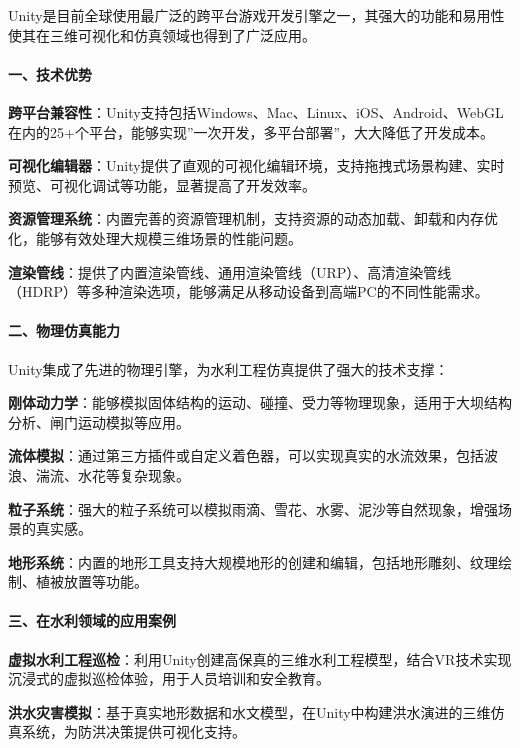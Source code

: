 Unity是目前全球使用最广泛的跨平台游戏开发引擎之一，其强大的功能和易用性使其在三维可视化和仿真领域也得到了广泛应用。

\paragraph{一、技术优势}\label{ux4e00ux6280ux672fux4f18ux52bf}

\textbf{跨平台兼容性}：Unity支持包括Windows、Mac、Linux、iOS、Android、WebGL在内的25+个平台，能够实现''一次开发，多平台部署''，大大降低了开发成本。

\textbf{可视化编辑器}：Unity提供了直观的可视化编辑环境，支持拖拽式场景构建、实时预览、可视化调试等功能，显著提高了开发效率。

\textbf{资源管理系统}：内置完善的资源管理机制，支持资源的动态加载、卸载和内存优化，能够有效处理大规模三维场景的性能问题。

\textbf{渲染管线}：提供了内置渲染管线、通用渲染管线（URP）、高清渲染管线（HDRP）等多种渲染选项，能够满足从移动设备到高端PC的不同性能需求。

\paragraph{二、物理仿真能力}\label{ux4e8cux7269ux7406ux4effux771fux80fdux529b}

Unity集成了先进的物理引擎，为水利工程仿真提供了强大的技术支撑：

\textbf{刚体动力学}：能够模拟固体结构的运动、碰撞、受力等物理现象，适用于大坝结构分析、闸门运动模拟等应用。

\textbf{流体模拟}：通过第三方插件或自定义着色器，可以实现真实的水流效果，包括波浪、湍流、水花等复杂现象。

\textbf{粒子系统}：强大的粒子系统可以模拟雨滴、雪花、水雾、泥沙等自然现象，增强场景的真实感。

\textbf{地形系统}：内置的地形工具支持大规模地形的创建和编辑，包括地形雕刻、纹理绘制、植被放置等功能。

\paragraph{三、在水利领域的应用案例}\label{ux4e09ux5728ux6c34ux5229ux9886ux57dfux7684ux5e94ux7528ux6848ux4f8b}

\textbf{虚拟水利工程巡检}：利用Unity创建高保真的三维水利工程模型，结合VR技术实现沉浸式的虚拟巡检体验，用于人员培训和安全教育。

\textbf{洪水灾害模拟}：基于真实地形数据和水文模型，在Unity中构建洪水演进的三维仿真系统，为防洪决策提供可视化支持。

